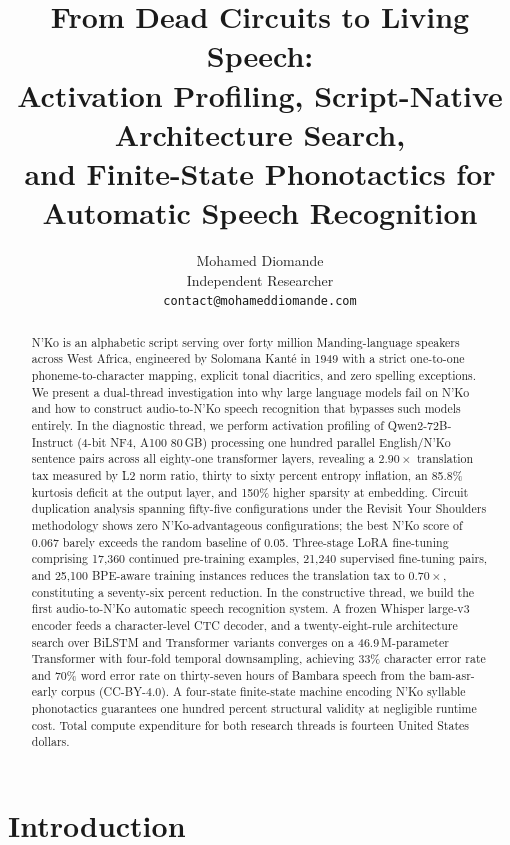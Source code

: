 \documentclass[11pt]{article}
\title{From Dead Circuits to Living Speech:\\Activation Profiling, Script-Native Architecture Search,\\and Finite-State Phonotactics for \nko{} Automatic Speech Recognition}
\author{
  Mohamed Diomande \\
  Independent Researcher \\
  \texttt{contact@mohameddiomande.com}
}
\newcommand{\nko}{N'Ko}
\begin{document}
\maketitle

\begin{abstract}
\nko{} is an alphabetic script serving over forty million Manding-language speakers across West Africa, engineered by Solomana Kant\'e in 1949 with a strict one-to-one phoneme-to-character mapping, explicit tonal diacritics, and zero spelling exceptions. We present a dual-thread investigation into why large language models fail on \nko{} and how to construct audio-to-\nko{} speech recognition that bypasses such models entirely. In the diagnostic thread, we perform activation profiling of Qwen2-72B-Instruct (4-bit NF4, A100 80\,GB) processing one hundred parallel English/\nko{} sentence pairs across all eighty-one transformer layers, revealing a $2.90\times$ translation tax measured by L2 norm ratio, thirty to sixty percent entropy inflation, an 85.8\% kurtosis deficit at the output layer, and 150\% higher sparsity at embedding. Circuit duplication analysis spanning fifty-five configurations under the Revisit Your Shoulders methodology shows zero \nko{}-advantageous configurations; the best \nko{} score of 0.067 barely exceeds the random baseline of 0.05. Three-stage LoRA fine-tuning comprising 17,360 continued pre-training examples, 21,240 supervised fine-tuning pairs, and 25,100 BPE-aware training instances reduces the translation tax to $0.70\times$, constituting a seventy-six percent reduction. In the constructive thread, we build the first audio-to-\nko{} automatic speech recognition system. A frozen Whisper large-v3 encoder feeds a character-level CTC decoder, and a twenty-eight-rule architecture search over BiLSTM and Transformer variants converges on a 46.9\,M-parameter Transformer with four-fold temporal downsampling, achieving 33\% character error rate and 70\% word error rate on thirty-seven hours of Bambara speech from the bam-asr-early corpus (CC-BY-4.0). A four-state finite-state machine encoding \nko{} syllable phonotactics guarantees one hundred percent structural validity at negligible runtime cost. Total compute expenditure for both research threads is fourteen United States dollars.
\end{abstract}

\section{Introduction}
\label{sec:introduction}
\end{document}

